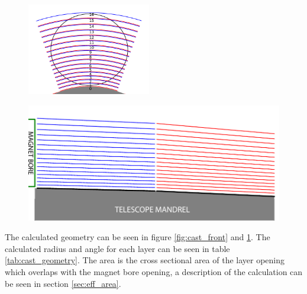 \begin{figure}[htbp]
\centering
\begin{minipage}{.5\textwidth}
  \centering
  \includegraphics[height=4cm]{figures/cast/cast_front.pdf}
  \label{fig:cast_front}
\end{minipage}%
\begin{minipage}{.5\textwidth}
  \centering  \includegraphics[width=\linewidth]{figures/cast/cast_side.pdf}
  \label{fig:cast_side}
\end{minipage}
\end{figure}

The calculated geometry can be seen in figure \ref{fig:cast_front} and \ref{fig:cast_side}. The calculated radius and angle for each layer can be seen in table \ref{tab:cast_geometry}. The area is the cross sectional area of the layer opening which overlaps with the magnet bore opening, a description of the calculation can be seen in section \ref{sec:eff_area}.

